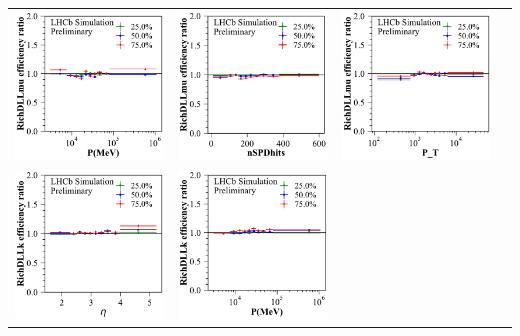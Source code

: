 \documentclass[oneside]{book}
\begin{document}
\begin{tabular}{l@{\hskip -0.0in}c@{\hskip -0.0in}c@{\hskip -0.0in}c}
\includegraphics[width=0.32\linewidth]{eff_ratio_RichDLLmu_vs_Brunel_P_at_[0.05, 0.1, 0.25, 0.5, 0.75, 0.9, 0.95].pdf} &
\includegraphics[width=0.32\linewidth]{eff_ratio_RichDLLmu_vs_nSPDhits_at_[0.05, 0.1, 0.25, 0.5, 0.75, 0.9, 0.95].pdf} &
\includegraphics[width=0.32\linewidth]{eff_ratio_RichDLLmu_vs_P_T_at_[0.05, 0.1, 0.25, 0.5, 0.75, 0.9, 0.95].pdf}\\
\vspace{-0.2cm}
\includegraphics[width=0.32\linewidth]{eff_ratio_RichDLLk_vs_Brunel_ETA_at_[0.05, 0.1, 0.25, 0.5, 0.75, 0.9, 0.95].pdf} &
\includegraphics[width=0.32\linewidth]{eff_ratio_RichDLLk_vs_Brunel_P_at_[0.05, 0.1, 0.25, 0.5, 0.75, 0.9, 0.95].pdf} &

\end{tabular}
\end{document}
